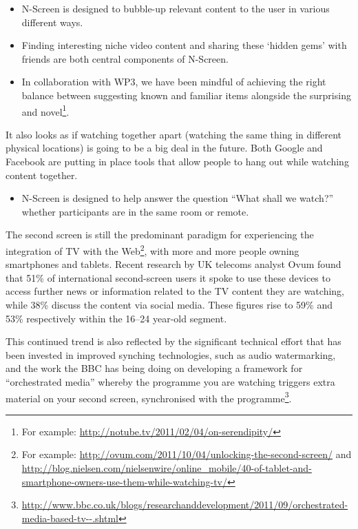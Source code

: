 \documentclass{notube}
\begin{document}
\begin{itemize}
\item{N-Screen is designed to bubble-up relevant content to the user in various different ways.}
\item{Finding interesting niche video content and sharing these `hidden gems’ with friends are both central components of N-Screen.}
\item{In collaboration with WP3, we have been mindful of achieving the right balance between suggesting known and familiar items alongside the surprising and novel\footnote{For example: \url{http://notube.tv/2011/02/04/on-serendipity/}}.}
\end{itemize}

It also looks as if watching together apart (watching the same thing in different physical locations) is going to be a big deal in the future. Both Google and Facebook are putting in place tools that allow people to hang out while watching content together.

\begin{itemize}
\item{N-Screen is designed to help answer the question ``What shall we watch?” whether participants are in the same room or remote.}
\end{itemize}

The second screen is still the predominant paradigm for experiencing the integration of TV with the Web\footnote{For example: \url{http://ovum.com/2011/10/04/unlocking-the-second-screen/} and \url{http://blog.nielsen.com/nielsenwire/online_mobile/40-of-tablet-and-smartphone-owners-use-them-while-watching-tv/}}, with more and more people owning smartphones and tablets. Recent research by UK telecoms analyst Ovum found that 51\% of international second-screen users it spoke to use these devices to access further news or information related to the TV content they are watching, while 38\% discuss the content via social media. These figures rise to 59\% and 53\% respectively within the 16–24 year-old segment.

This continued trend is also reflected by the significant technical effort that has been invested in improved synching technologies, such as audio watermarking, and the work the BBC has being doing on developing a framework for ``orchestrated media” whereby the programme you are watching triggers extra material on your second screen, synchronised with the programme\footnote{\url{http://www.bbc.co.uk/blogs/researchanddevelopment/2011/09/orchestrated-media-based-tv--.shtml}}. 
\end{document}

